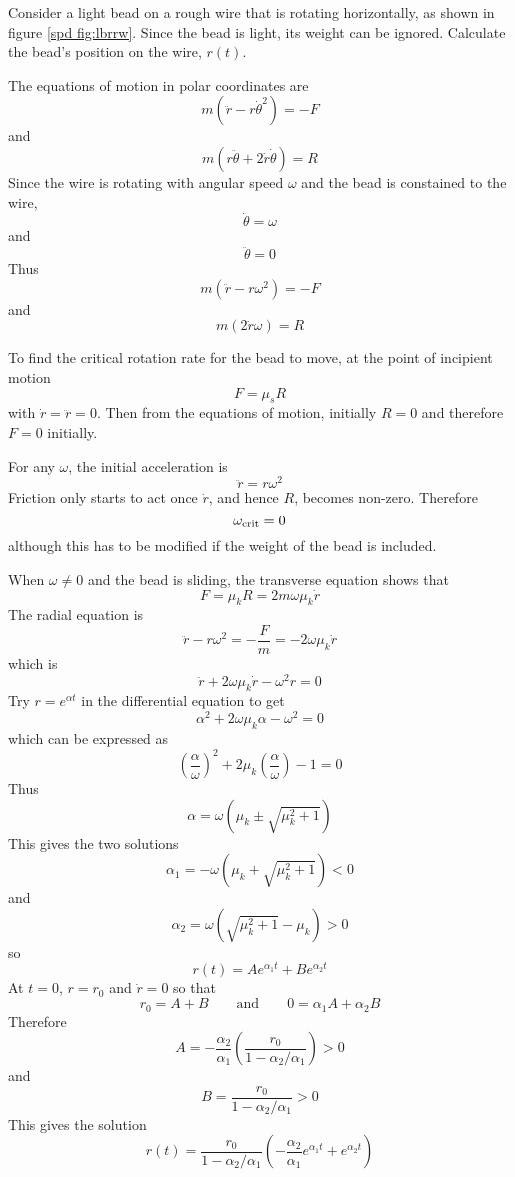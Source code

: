 \begin{example}
\problem
Consider a light bead on a rough wire that is rotating horizontally, as
shown in figure \ref{spd fig:lbrrw}.  Since the bead is light, its weight 
can be ignored.  Calculate the bead's position on the wire, $r(t)$.

\solution
The equations of motion in polar coordinates are
$$m(\ddot{r}-r\dot{\theta}^2)=-F$$
and
$$m(r\ddot{\theta}+2\dot{r}\dot{\theta})=R$$
Since the wire is rotating with angular speed $\omega$ and the bead is
constained to the wire, 
$$\dot{\theta}=\omega$$
and
$$\ddot{\theta}=0$$
Thus
$$m(\ddot{r}-r\omega^2)=-F$$
and
$$m(2\dot{r}\omega)=R$$

To find the critical rotation rate for the bead to move, at the point of
incipient motion
$$F=\mu_sR$$ 
with $\dot{r}=\ddot{r}=0$.  Then from the equations of motion, initially
$R=0$ and therefore $F=0$ initially.  

For any $\omega$, the initial acceleration is
$$\ddot{r}=r\omega^2$$
Friction only starts to act once $\dot{r}$, and hence $R$, becomes non-zero.
Therefore
$$\omega_{\rm crit}=0$$
although this has to be modified if the weight of the bead is included.


When $\omega\neq 0$ and the bead is sliding, the transverse equation shows 
that
$$F=\mu_kR=2m\omega\mu_k\dot{r}$$
The radial equation is
$$\ddot{r}-r\omega^2=-\frac{F}{m}=-2\omega\mu_k\dot{r}$$
which is
$$\ddot{r}+2\omega\mu_k\dot{r}-\omega^2r=0$$
Try $r=e^{\alpha t}$ in the differential equation to get
$$\alpha^2+2\omega\mu_k\alpha-\omega^2=0$$
which can be expressed as
$$\left(\frac{\alpha}{\omega}\right)^2+2\mu_k\left(\frac{\alpha}{\omega}
\right)-1=0$$
Thus
$$\alpha=\omega\left(\mu_k\pm\sqrt{\mu_k^2+1}\right)$$
This gives the two solutions
$$\alpha_1=-\omega\left(\mu_k+\sqrt{\mu_k^2+1}\right)<0$$
and
$$\alpha_2=\omega\left(\sqrt{\mu_k^2+1}-\mu_k\right)>0$$
so 
$$r(t)=Ae^{\alpha_1t}+Be^{\alpha_2t}$$
At $t=0$, $r=r_0$ and $\dot{r}=0$ so that
$$r_0=A+B\qquad\mbox{and}\qquad 0=\alpha_1A+\alpha_2B$$
Therefore
$$A=-\frac{\alpha_2}{\alpha_1}\left(\frac{r_0}{1-\alpha_2/\alpha_1}
\right)>0$$
and
$$B=\frac{r_0}{1-\alpha_2/\alpha_1}>0$$
This gives the solution
$$r(t)=\frac{r_0}{1-\alpha_2/\alpha_1}\left(
-\frac{\alpha_2}{\alpha_1}e^{\alpha_1t}+e^{\alpha_2t}
\right)$$
\end{example}

